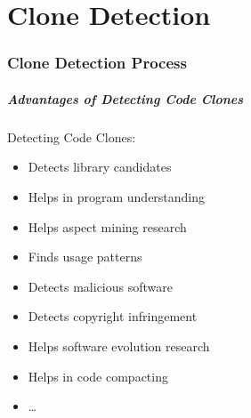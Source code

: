 \documentclass[pdf]{beamer}
\begin{document}
\part{Clone Detection}
\frame{\partpage}

\section{Clone Detection Process}

\begin{frame}
\frametitle{Advantages of Detecting Code Clones}
\begin{block}{Detecting Code Clones:}
\begin{itemize}
  \item Detects library candidates
  \item Helps in program understanding
  \item Helps aspect mining research
  \item Finds usage patterns
  \item Detects malicious software
  \item Detects copyright infringement
  \item Helps software evolution research
  \item Helps in code compacting
  \item \ldots
\end{itemize}
\end{block}
\end{frame}
\end{document}
